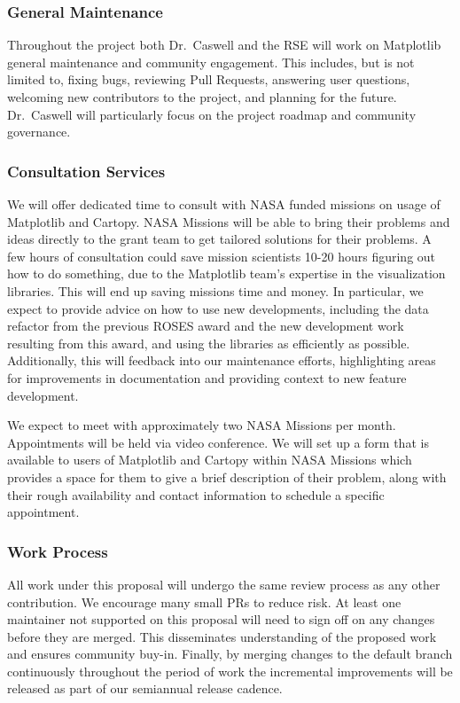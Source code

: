 \documentclass[12pt]{article}
\numberwithin{page}{section}
\begin{document}
\subsubsection{General Maintenance}

Throughout the project both Dr.\ Caswell and the RSE will work on
Matplotlib general maintenance and community engagement.  This includes,
but is not limited to, fixing bugs, reviewing Pull Requests, answering
user questions, welcoming new contributors to the project, and
planning for the future.  Dr.\ Caswell will particularly focus on
the project roadmap and community governance.

\subsubsection{Consultation Services}

We will offer dedicated time to consult with NASA funded missions on usage of Matplotlib and Cartopy.
NASA Missions will be able to bring their problems and ideas directly to the grant team to get tailored solutions for their problems.
A few hours of consultation could save mission scientists 10-20 hours figuring out how to do something, due to the Matplotlib team's expertise in the visualization libraries.
This will end up saving missions time and money.
In particular, we expect to provide advice on how to use new developments, including the data refactor from the previous ROSES award and the new development work resulting from this award, and using the libraries as efficiently as possible.
Additionally, this will feedback into our maintenance efforts, highlighting areas for improvements in documentation and providing context to new feature development.

We expect to meet with approximately two NASA Missions per month.
Appointments will be held via video conference.
We will set up a form that is available to users of Matplotlib and Cartopy within NASA Missions which provides a space for them to give a brief description of their problem, along with their rough availability and contact information to schedule a specific appointment.


\subsubsection{Work Process}

All work under this proposal will undergo the same review process
as any other contribution.  We
encourage many small PRs to reduce risk.  At least one maintainer not
supported on this proposal
will need to sign off on any changes before they are merged. This
disseminates understanding of the proposed work and ensures
community buy-in.  Finally, by merging
changes to the default branch continuously throughout the period of
work the incremental improvements will be released as part of our
semiannual release cadence.
\end{document}
